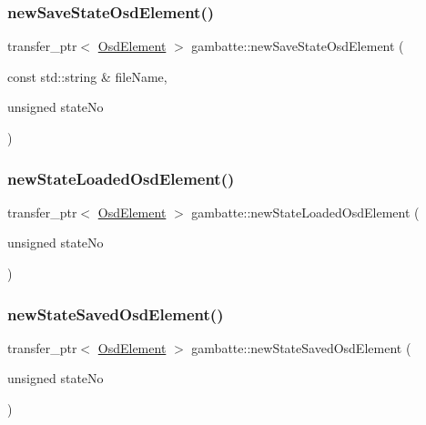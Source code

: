 \mbox{\label{namespacegambatte_a1371486452b5f3516b9925c72febc9c4}} 
\subsubsection{\texorpdfstring{new\+Save\+State\+Osd\+Element()}{newSaveStateOsdElement()}}
{\footnotesize\ttfamily transfer\+\_\+ptr$<$ \hyperlink{classgambatte_1_1OsdElement}{Osd\+Element} $>$ gambatte\+::new\+Save\+State\+Osd\+Element (\begin{DoxyParamCaption}\item[{const std\+::string \&}]{file\+Name,  }\item[{unsigned}]{state\+No }\end{DoxyParamCaption})}

\mbox{\label{namespacegambatte_a390e2b59815cfe5fcb669ee0e922813b}} 
\subsubsection{\texorpdfstring{new\+State\+Loaded\+Osd\+Element()}{newStateLoadedOsdElement()}}
{\footnotesize\ttfamily transfer\+\_\+ptr$<$ \hyperlink{classgambatte_1_1OsdElement}{Osd\+Element} $>$ gambatte\+::new\+State\+Loaded\+Osd\+Element (\begin{DoxyParamCaption}\item[{unsigned}]{state\+No }\end{DoxyParamCaption})}

\mbox{\label{namespacegambatte_abe8d300e4073eaf914b3aa4659c409c3}} 
\subsubsection{\texorpdfstring{new\+State\+Saved\+Osd\+Element()}{newStateSavedOsdElement()}}
{\footnotesize\ttfamily transfer\+\_\+ptr$<$ \hyperlink{classgambatte_1_1OsdElement}{Osd\+Element} $>$ gambatte\+::new\+State\+Saved\+Osd\+Element (\begin{DoxyParamCaption}\item[{unsigned}]{state\+No }\end{DoxyParamCaption})}

